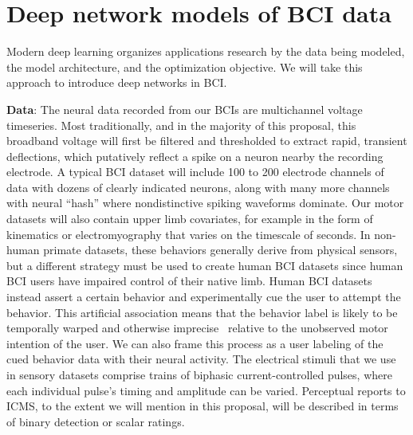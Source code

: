 \documentclass[12pt,oneside]{report}
\begin{document}
\section{Deep network models of BCI data}

Modern deep learning organizes applications research by the data being modeled, the model architecture, and the optimization objective. We will take this approach to introduce deep networks in BCI.

\textbf{Data}: The neural data recorded from our BCIs are multichannel voltage timeseries. Most traditionally, and in the majority of this proposal, this broadband voltage will first be filtered and thresholded to extract rapid, transient deflections, which putatively reflect a spike on a neuron nearby the recording electrode. A typical BCI dataset will include 100 to 200 electrode channels of data with dozens of clearly indicated neurons, along with many more channels with neural “hash” where nondistinctive spiking waveforms dominate. Our motor datasets will also contain upper limb covariates, for example in the form of kinematics or electromyography that varies on the timescale of seconds. In non-human primate datasets, these behaviors generally derive from physical sensors, but a different strategy must be used to create human BCI datasets since human BCI users have impaired control of their native limb. Human BCI datasets instead assert a certain behavior and experimentally cue the user to attempt the behavior. This artificial association means that the behavior label is likely to be temporally warped and otherwise imprecise~\citep{merel2016neuroprosthetic} relative to the unobserved motor intention of the user. We can also frame this process as a user labeling of the cued behavior data with their neural activity. The electrical stimuli that we use in sensory datasets comprise trains of biphasic current-controlled pulses, where each individual pulse’s timing and amplitude can be varied. Perceptual reports to ICMS, to the extent we will mention in this proposal, will be described in terms of binary detection or scalar ratings.
\end{document}
